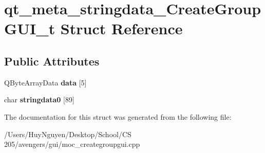 \hypertarget{structqt__meta__stringdata__CreateGroupGUI__t}{}\section{qt\+\_\+meta\+\_\+stringdata\+\_\+\+Create\+Group\+G\+U\+I\+\_\+t Struct Reference}
\label{structqt__meta__stringdata__CreateGroupGUI__t}
\subsection*{Public Attributes}
\begin{DoxyCompactItemize}
\item 
Q\+Byte\+Array\+Data {\bfseries data} \mbox{[}5\mbox{]}\hypertarget{structqt__meta__stringdata__CreateGroupGUI__t_a62fd4f3b3264ab2f5506c83550cf3472}{}\label{structqt__meta__stringdata__CreateGroupGUI__t_a62fd4f3b3264ab2f5506c83550cf3472}

\item 
char {\bfseries stringdata0} \mbox{[}89\mbox{]}\hypertarget{structqt__meta__stringdata__CreateGroupGUI__t_a0b844bf254922f04cf29b7a767e3d4c6}{}\label{structqt__meta__stringdata__CreateGroupGUI__t_a0b844bf254922f04cf29b7a767e3d4c6}

\end{DoxyCompactItemize}


The documentation for this struct was generated from the following file\+:\begin{DoxyCompactItemize}
\item 
/\+Users/\+Huy\+Nguyen/\+Desktop/\+School/\+C\+S 205/avengers/gui/moc\+\_\+creategroupgui.\+cpp\end{DoxyCompactItemize}
